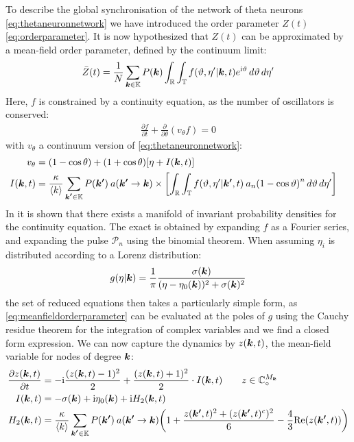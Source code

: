 To describe the global synchronisation of the network of theta neurons \eqref{eq:thetaneuronnetwork} we have introduced the order parameter $Z(t)$\eqref{eq:orderparameter}. It is now hypothesized that $Z(t)$ can be approximated by a mean-field order parameter, defined by the continuum limit:
\begin{align}
\bar{Z}(t)= \frac{1}{N} \sum_{\k \in \K}P(\k) \int_{\R} \int_{\T} f\left(\vartheta, \eta^{\prime} | \k, t\right) e^{\ic \vartheta} \mathop{d \vartheta} \mathop{d \eta^{\prime}} \label{eq:meanfieldorderparameter}
\end{align}
Here, $f$ is constrained by a continuity equation, as the number of oscillators is conserved:
\begin{align}
\frac{\partial f}{\partial t}+\frac{\partial}{\partial \theta}\left(v_{\theta} f\right) = 0 \label{eq:transportequation}
\end{align}
with $v_{\theta}$ a continuum version of \eqref{eq:thetaneuronnetwork}:
\begin{align*}
v_{\theta} &= (1-\cos \theta)+(1+\cos \theta) \left[\eta + I(\k,t) \right]\\
I(\k,t) &= \frac{\kappa}{\kmean}\sum_{\kacc \in \K} P(\kacc ) \:a\left(\kacc \rightarrow \k \right) \times \left[ \int_{\R} \int_{\T} f\left(\vartheta, \eta^{\prime} | \kacc, t\right) \: a_{n} \left(1-\cos \vartheta\right)^{n} \mathop{d \vartheta} \mathop{d \eta^{\prime}} \right] &
\end{align*}
In \cite{OttAntonsen2008} it is shown that there exists a manifold of invariant probability densities for the continuity equation. The exact \MFR is obtained by expanding $f$ as a Fourier series, and expanding the pulse $\mathcal{P}_n$ using the binomial theorem. When assuming $\eta_i$ is distributed according to a Lorenz distribution:
\begin{align}
g(\eta |{\boldsymbol{k}})=\frac{1}{\pi} \frac{\sigma({\boldsymbol{k}})}{(\eta-\eta_{0}({\boldsymbol{k}}))^{2}+\sigma({\boldsymbol{k}})^{2}} \label{eq:Lorentzpdf}
\end{align}
the set of reduced equations then takes a particularly simple form, as \eqref{eq:meanfieldorderparameter} can be evaluated at the poles of $g$ using the Cauchy residue theorem for the integration of complex variables and we find a closed form expression. We can now capture the dynamics by $z({\boldsymbol{k}},t)$, the mean-field variable for nodes of degree ${\boldsymbol{k}}$:
\begin{align}
\frac{\partial z(\k, t)}{\partial t} &= -\ic \frac{(z(\k, t)-1)^{2}}{2} + \frac{(z(\k, t)+1)^{2}}{2} \cdot I(\k, t) \qquad z \in \C^{M_\k} \nonumber \\
I(\k, t) &= -\sigma(\k) + \ic \eta_{0}(\k) + \ic H_2(\k,t) \label{eq:OttAntonsenSystemFull} \\
H_2(\k,t) &= \frac{\kappa}{\kmean} \sum_{\kacc \in \K} P\left(\kacc\right) \: a\left(\kacc \rightarrow \k\right)  \left( 1 + \frac{z(\kacc, t)^2 + (z(\kacc, t)^c )^2}{6} - \frac{4}{3} \Re(z(\kacc, t)) \right) \nonumber
\end{align}

